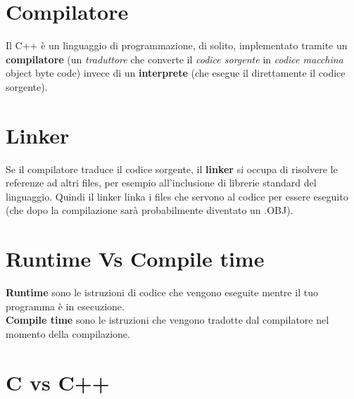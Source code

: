 \section{Compilatore}

\textsf{\small Il C++ è un linguaggio di programmazione, di solito, implementato tramite un \textbf{compilatore} (un \emph{traduttore} che converte il \emph{codice sorgente} in \emph{codice macchina} object byte code) invece di un \textbf{interprete} (che esegue il direttamente il codice sorgente).} \\


\section{Linker}

\textsf{\small Se il compilatore traduce il codice sorgente, il \textbf{linker} si occupa di risolvere le referenze ad altri files, per esempio all'inclusione di librerie standard del linguaggio. Quindi il linker linka i files che servono al codice per essere eseguito (che dopo la compilazione sarà probabilmente diventato un .OBJ).} \\



\section{Runtime Vs Compile time}

\textsf{\small \textbf{Runtime} sono le istruzioni di codice che vengono eseguite mentre il tuo programma è in esecuzione.} \\

\textsf{\small \textbf{Compile time} sono le istruzioni che vengono tradotte dal compilatore nel momento della compilazione.} \\


\newpage

\section{C vs C++}

